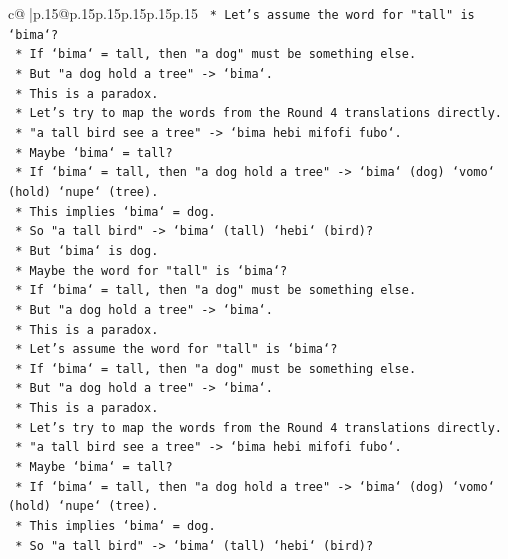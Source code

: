\documentclass{article}
\begin{document}
{\begin{supertabular}{c@{$\;$}|p{.15\linewidth}@{}p{.15\linewidth}p{.15\linewidth}p{.15\linewidth}p{.15\linewidth}p{.15\linewidth}}
{{{\texttt{        *   Let's assume the word for "tall" is `bima`?} \\
\texttt{        *   If `bima` = tall, then "a dog" must be something else.} \\
\texttt{        *   But "a dog hold a tree" {-}> `bima`.} \\
\texttt{        *   This is a paradox.} \\
\texttt{        *   Let's try to map the words from the Round 4 translations directly.} \\
\texttt{        *   "a tall bird see a tree" {-}> `bima hebi mifofi fubo`.} \\
\texttt{        *   Maybe `bima` = tall?} \\
\texttt{        *   If `bima` = tall, then "a dog hold a tree" {-}> `bima` (dog) `vomo` (hold) `nupe` (tree).} \\
\texttt{        *   This implies `bima` = dog.} \\
\texttt{        *   So "a tall bird" {-}> `bima` (tall) `hebi` (bird)?} \\
\texttt{        *   But `bima` is dog.} \\
\texttt{        *   Maybe the word for "tall" is `bima`?} \\
\texttt{        *   If `bima` = tall, then "a dog" must be something else.} \\
\texttt{        *   But "a dog hold a tree" {-}> `bima`.} \\
\texttt{        *   This is a paradox.} \\
\texttt{        *   Let's assume the word for "tall" is `bima`?} \\
\texttt{        *   If `bima` = tall, then "a dog" must be something else.} \\
\texttt{        *   But "a dog hold a tree" {-}> `bima`.} \\
\texttt{        *   This is a paradox.} \\
\texttt{        *   Let's try to map the words from the Round 4 translations directly.} \\
\texttt{        *   "a tall bird see a tree" {-}> `bima hebi mifofi fubo`.} \\
\texttt{        *   Maybe `bima` = tall?} \\
\texttt{        *   If `bima` = tall, then "a dog hold a tree" {-}> `bima` (dog) `vomo` (hold) `nupe` (tree).} \\
\texttt{        *   This implies `bima` = dog.} \\
\texttt{        *   So "a tall bird" {-}> `bima` (tall) `hebi` (bird)?} \\
}}}
\end{supertabular}}
\end{document}
